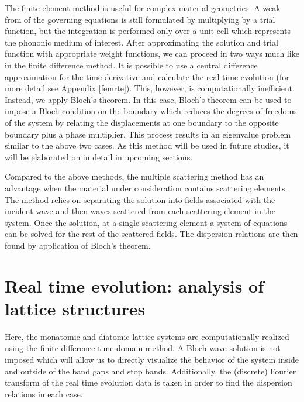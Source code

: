 \documentclass{article}
\begin{document}
The finite element method is useful for complex material geometries. A weak 
from of the governing equations is still 
formulated by multiplying by a trial function, but the integration is performed 
only over a unit cell which represents the phononic medium of interest. After 
approximating the solution and trial function with appropriate weight 
functions, we can proceed in two ways much like in the finite difference 
method. It is possible to use a central difference approximation for the time 
derivative and calculate the real time evolution (for more detail see Appendix 
\ref{femrte}). This, however, is 
computationally inefficient. Instead, we apply Bloch's theorem. In this case, 
Bloch's theorem can be used to impose a Bloch condition on the 
boundary which reduces the degrees of freedoms of the system by relating the 
displacements at one boundary to the opposite boundary plus a phase multiplier.
This process results in an eigenvalue problem similar to the above two cases. 
As this method will be used in future studies, it will be elaborated on in 
detail in upcoming sections.

Compared to the above methods, the multiple scattering method has an advantage 
when the material under consideration contains scattering elements. The method 
relies on separating the solution into fields associated with the incident wave 
and then waves scattered from each scattering element in the system. Once the 
solution, at a single scattering element a system of equations can be solved 
for the rest of the scattered fields. The dispersion relations are then found 
by application of Bloch's theorem. 

\section{Real time evolution: analysis of lattice structures}
Here, the monatomic and diatomic lattice systems are computationally realized
using the finite difference time domain method. A Bloch wave solution is not 
imposed which will allow us to directly visualize the behavior of the 
system inside and outside of the band gaps and stop bands. Additionally, the 
(discrete) Fourier transform of the real time evolution data is taken in order 
to find the dispersion relations in each case. 
\end{document}
